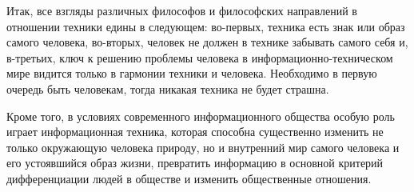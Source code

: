 Итак, все взгляды различных философов и философских направлений в отношении техники едины в следующем: во-первых, техника есть знак или образ самого человека, во-вторых, человек не должен в технике забывать самого себя и, в-третьих, ключ к решению проблемы человека в информационно-техническом мире видится только в гармонии техники и человека. Необходимо в первую очередь быть человекам, тогда никакая техника не будет страшна.

Кроме того, в условиях современного информационного общества особую роль играет информационная техника, которая способна существенно изменить не только окружающую человека природу, но и внутренний мир самого человека и его устоявшийся образ жизни, превратить информацию в основной критерий дифференциации людей в обществе и изменить общественные отношения. 
